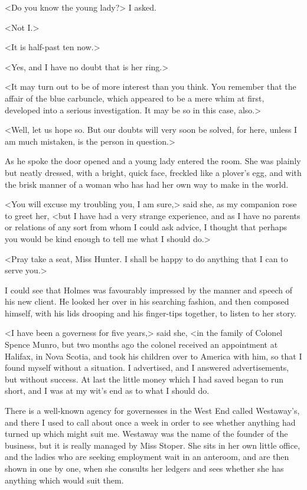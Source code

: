 <Do you know the young lady?> I asked.

<Not I\@.>

<It is half-past ten now.>

<Yes, and I have no doubt that is her ring.>

<It may turn out to be of more interest than you think. You remember that the affair of the blue carbuncle, which appeared to be a mere whim at first, developed into a serious investigation. It may be so in this case, also.>

<Well, let us hope so. But our doubts will very soon be solved, for here, unless I am much mistaken, is the person in question.>

As he spoke the door opened and a young lady entered the room. She was plainly but neatly dressed, with a bright, quick face, freckled like a plover's egg, and with the brisk manner of a woman who has had her own way to make in the world.

<You will excuse my troubling you, I am sure,> said she, as my companion rose to greet her, <but I have had a very strange experience, and as I have no parents or relations of any sort from whom I could ask advice, I thought that perhaps you would be kind enough to tell me what I should do.>

<Pray take a seat, Miss Hunter. I shall be happy to do anything that I can to serve you.>

I could see that Holmes was favourably impressed by the manner and speech of his new client. He looked her over in his searching fashion, and then composed himself, with his lids drooping and his finger-tips together, to listen to her story.

<I have been a governess for five years,> said she, <in the family of Colonel Spence Munro, but two months ago the colonel received an appointment at Halifax, in Nova Scotia, and took his children over to America with him, so that I found myself without a situation. I advertised, and I answered advertisements, but without success. At last the little money which I had saved began to run short, and I was at my wit's end as to what I should do.

There is a well-known agency for governesses in the West End called Westaway's, and there I used to call about once a week in order to see whether anything had turned up which might suit me. Westaway was the name of the founder of the business, but it is really managed by Miss Stoper. She sits in her own little office, and the ladies who are seeking employment wait in an anteroom, and are then shown in one by one, when she consults her ledgers and sees whether she has anything which would suit them.

